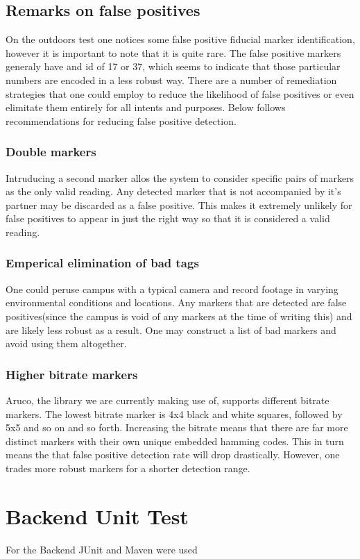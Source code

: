 \subsection{Remarks on false positives}
On the outdoors test one notices some false positive fiducial marker identification, however it is important to note that it is quite rare. The false positive markers generaly have and id of 17 or 37, which seems to indicate that those particular numbers are encoded in a less robust way. There are a number of remediation strategies that one could employ to reduce the likelihood of false positives or even elimitate them entirely for all intents and purposes. Below follows recommendations for reducing false positive detection.
\subsubsection{Double markers}
Intruducing a second marker allos the system to consider specific pairs of markers as the only valid reading. Any detected marker that is not accompanied by it's partner may be discarded as a false positive. This makes it extremely unlikely for false positives to appear in just the right way so that it is considered a valid reading.
\subsubsection{Emperical elimination of bad tags}
One could peruse campus with a typical camera and record footage in varying environmental conditions and locations. Any markers that are detected are false positives(since the campus is void of any markers at the time of writing this) and are likely less robust as a result. One may construct a list of bad markers and avoid using them altogether.
\subsubsection{Higher bitrate markers}
Aruco, the library we are currently making use of, supports different bitrate markers. The lowest bitrate marker is 4x4 black and white squares, followed by 5x5 and so on and so forth. Increasing the bitrate means that there are far more distinct markers with their own unique embedded hamming codes. This in turn means the that false positive detection rate will drop drastically. However, one trades more robust markers for a shorter detection range.

\section{Backend Unit Test}
For the Backend JUnit and Maven were used


